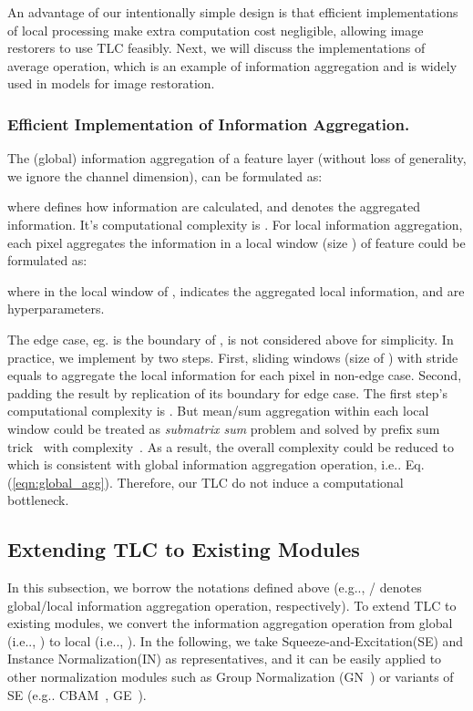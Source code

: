 \documentclass[runningheads]{llncs}
\makeatletter
\DeclareRobustCommand\onedot{\futurelet\@let@token\@onedot}
\def\@onedot{\ifx\@let@token.\else.\null\fi\xspace}
\def\eg{e.g\onedot}
\def\ie{i.e\onedot}
\makeatother
\begin{document}
An advantage of our intentionally simple design is that efficient implementations of local processing make extra computation cost negligible, allowing image restorers to use TLC feasibly. Next, we will discuss the implementations of average operation, which is an example of information aggregation and is widely used in models for image restoration. 

\subsubsection{Efficient Implementation of Information Aggregation.} 
The (global) information aggregation of a feature layer  (without loss of generality, we ignore the channel dimension), can be formulated as:

where   defines how information are calculated, and  denotes the aggregated information. It's computational complexity is .
For local information aggregation, each pixel  aggregates the information in a local window (size ) of feature  could be formulated as:

where  in the local window of ,  indicates the aggregated local information, and  are hyperparameters. 

The edge case, eg.  is the boundary of , is not considered above for simplicity. In practice, we implement  by two steps. First, sliding windows (size of ) with stride equals  to aggregate the local information for each pixel in non-edge case. Second, padding the result by replication of its boundary for edge case. The first step's computational complexity is . 
But mean/sum aggregation within each local window could be treated as \textit{submatrix sum} problem and solved by prefix sum trick~\cite{harris2007parallel} with  complexity~\cite{amir2004submatrices}.
As a result, the overall complexity could be reduced to  which is consistent with global information aggregation operation, \ie Eq.(\ref{eqn:global_agg}). 
Therefore, our TLC do not induce a computational bottleneck. 

\subsection{Extending TLC to Existing Modules}\label{sec:method:extend}
In this subsection, we borrow the notations defined above (\eg,  / denotes global/local information aggregation operation, respectively). To extend TLC to existing modules, we convert the information aggregation operation from global (\ie, ) to local (\ie, ). 
In the following, we take Squeeze-and-Excitation(SE) and Instance Normalization(IN) as representatives, and it can be easily applied to other normalization modules such as Group Normalization (GN~\cite{wu2018group}) or variants of SE (\eg CBAM~\cite{woo2018cbam}, GE~\cite{hu2018gather}).
\end{document}
